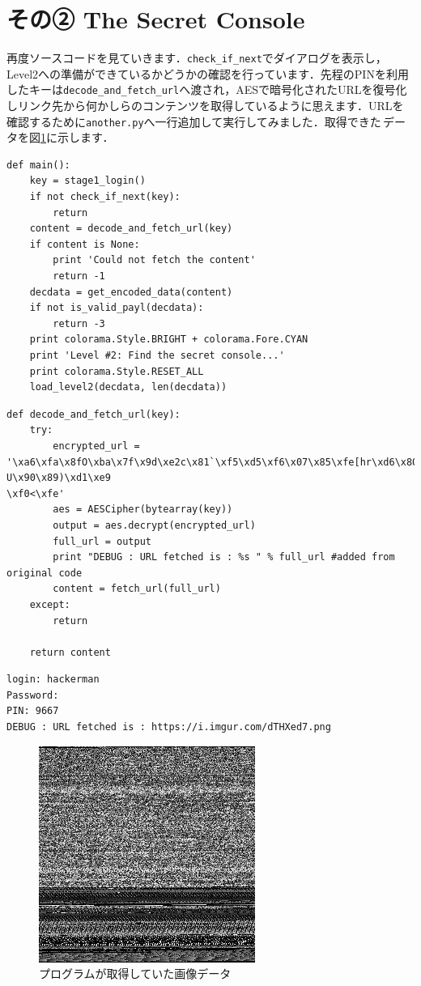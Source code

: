 \section{その② The Secret Console}
再度ソースコードを見ていきます．\texttt{check\_if\_next}でダイアログを表示し，Level2への準備ができているかどうかの確認を行っています．先程のPINを利用したキーは\texttt{decode\_and\_fetch\_url}へ渡され，AESで暗号化されたURLを復号化しリンク先から何かしらのコンテンツを取得しているように思えます．URLを確認するために\texttt{another.py}へ一行追加して実行してみました．取得できた\faFileImageO \,データを図\ref{fig:decrypt_url_data}に示します．
\begin{tcolorbox}[sharp corners, left=2mm]\scriptsize
\begin{verbatim}
def main():
    key = stage1_login()
    if not check_if_next(key):
        return
    content = decode_and_fetch_url(key)
    if content is None:
        print 'Could not fetch the content'
        return -1
    decdata = get_encoded_data(content)
    if not is_valid_payl(decdata):
        return -3
    print colorama.Style.BRIGHT + colorama.Fore.CYAN
    print 'Level #2: Find the secret console...'
    print colorama.Style.RESET_ALL
    load_level2(decdata, len(decdata))
\end{verbatim}
\end{tcolorbox}
\begin{tcolorbox}[sharp corners, left=2mm]\scriptsize
\begin{verbatim}
def decode_and_fetch_url(key):
    try:
        encrypted_url = 
'\xa6\xfa\x8fO\xba\x7f\x9d\xe2c\x81`\xf5\xd5\xf6\x07\x85\xfe[hr\xd6\x80?U\x90\x89)\xd1\xe9
\xf0<\xfe'
        aes = AESCipher(bytearray(key))
        output = aes.decrypt(encrypted_url)
        full_url = output
        print "DEBUG : URL fetched is : %s " % full_url #added from original code
        content = fetch_url(full_url)
    except:
        return

    return content
\end{verbatim}
\end{tcolorbox}
\begin{tcolorbox}[sharp corners, left=2mm]\scriptsize
\begin{verbatim}
login: hackerman
Password:
PIN: 9667
DEBUG : URL fetched is : https://i.imgur.com/dTHXed7.png
\end{verbatim}
\end{tcolorbox}
\begin{figure}[htb]
    \centering
    \includegraphics[width=0.4\linewidth]{./assets/takuzoo3868asset/dTHXed7_gray.png}
    \caption{プログラムが取得していた画像データ}
    \label{fig:decrypt_url_data}
\end{figure}
